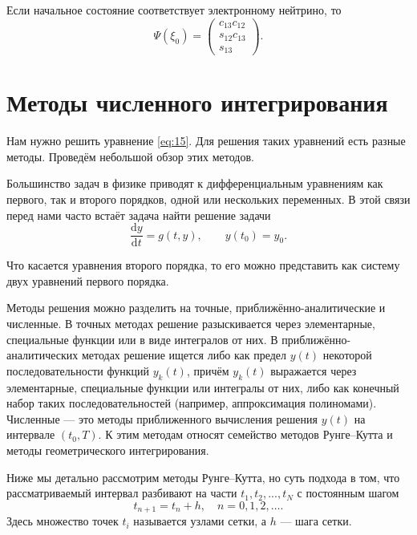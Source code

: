 \documentclass[a4paper,12pt]{article}
\newcommand{\dd}{\mathrm{d}}
\begin{document}
	Если начальное состояние соответствует электронному нейтрино, то
		\begin{equation}\label{eq:19}
  		\Psi(\xi_0)=
  		\begin{pmatrix}
  		c_{13}c_{12}\\
  		 s_{12}c_{13}\\
  		 s_{13}
  		\end{pmatrix}.
  	\end{equation}

	\newpage
	\section{Методы численного интегрирования}

	Нам нужно решить уравнение \eqref{eq:15}. Для решения таких уравнений есть
	разные методы. Проведём небольшой обзор этих методов.

  Большинство задач в физике приводят к дифференциальным уравнениям как первого,
	так и второго порядков, одной или нескольких переменных. В этой связи перед
	нами часто встаёт задача найти решение задачи
	\begin{equation}\label{eq:21}
		\frac{\dd y}{\dd t}=g(t,y),\qquad y(t_0)=y_0.
	\end{equation}

	Что касается уравнения второго порядка, то его можно представить как систему
двух уравнений первого порядка.

	Методы решения  можно разделить на точные, приближённо-аналитические и
	численные. В точных методах решение разыскивается через элементарные,
	специальные функции или в виде интегралов от них.
  В приближённо-аналитических методах решение ищется либо как предел
  \(y(t)\) некоторой последовательности функций \(y_k(t)\), причём \(y_k(t)\)
  выражается через элементарные, специальные функции или интегралы от них, либо
  как конечный набор таких последовательностей (например, аппроксимация
  полиномами).
  Численные — это методы приближенного вычисления решения \(y(t)\) на
  интервале \((t_0,T)\). К этим методам относят семейство методов Рунге--Кутта и
  методы геометрического интегрирования.

  Ниже мы детально рассмотрим методы Рунге--Кутта, но суть подхода в том, что
  рассматриваемый интервал разбивают на части \(t_1,t_2,...,t_N\) с постоянным
  шагом
	\begin{equation}\label{eq:22}
			t_{n+1}=t_n+h,\quad n=0, 1, 2,\ldots.
	\end{equation}
	Здесь множество точек \(t_i\) называется узлами сетки, а \(h\) --- шага сетки.
\end{document}
